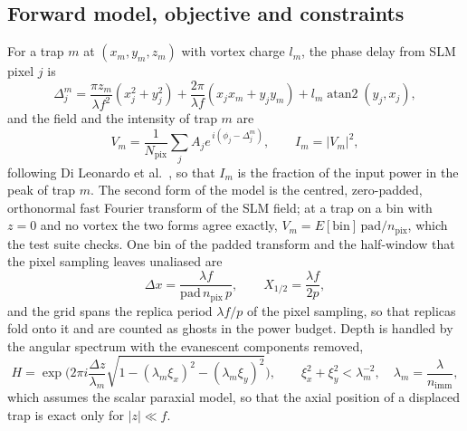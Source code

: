 \subsection{Forward model, objective and constraints}\label{sec:problem-obj}

For a trap $m$ at $(x_m,y_m,z_m)$ with vortex charge $l_m$, the phase delay from SLM pixel $j$ is
\begin{equation}
\Delta_j^m=\frac{\pi z_m}{\lambda f^2}(x_j^2+y_j^2)+\frac{2\pi}{\lambda f}(x_jx_m+y_jy_m)+l_m\operatorname{atan2}(y_j,x_j),
\label{eq:delay}
\end{equation}
and the field and the intensity of trap $m$ are
\begin{equation}
V_m=\frac1{N_{\mathrm{pix}}}\sum_jA_je^{\,i(\phi_j-\Delta_j^m)},\qquad I_m=|V_m|^2,
\label{eq:field}
\end{equation}
following Di Leonardo et al.~\cite{dileonardo}, so that $I_m$ is the fraction of the input power in the peak of trap $m$. The second form of the model is the centred, zero-padded, orthonormal fast Fourier transform of the SLM field; at a trap on a bin with $z=0$ and no vortex the two forms agree exactly, $V_m=E[\mathrm{bin}]\,\mathrm{pad}/n_{\mathrm{pix}}$, which the test suite checks. One bin of the padded transform and the half-window that the pixel sampling leaves unaliased are
\begin{equation}
\Delta x=\frac{\lambda f}{\mathrm{pad}\,n_{\mathrm{pix}}\,p},\qquad X_{1/2}=\frac{\lambda f}{2p},
\label{eq:window}
\end{equation}
and the grid spans the replica period $\lambda f/p$ of the pixel sampling, so that replicas fold onto it and are counted as ghosts in the power budget. Depth is handled by the angular spectrum with the evanescent components removed,
\begin{equation}
H=\exp\!\Big(2\pi i\frac{\Delta z}{\lambda_m}\sqrt{1-(\lambda_m\xi_x)^2-(\lambda_m\xi_y)^2}\Big),\qquad \xi_x^2+\xi_y^2<\lambda_m^{-2},\quad\lambda_m=\frac{\lambda}{n_{\mathrm{imm}}},
\label{eq:angspec}
\end{equation}
which assumes the scalar paraxial model, so that the axial position of a displaced trap is exact only for $|z|\ll f$.

